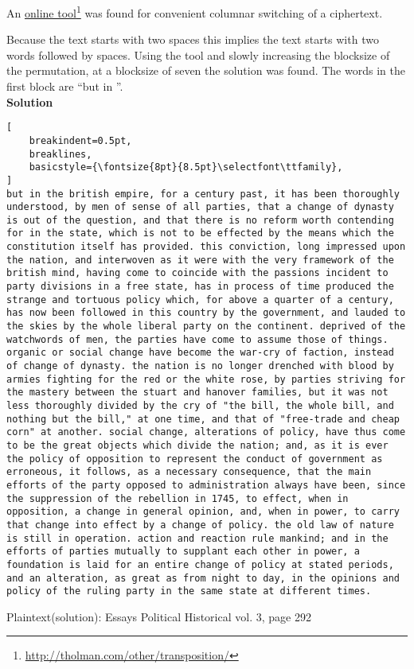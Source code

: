 \documentclass{uva-inf-bachelor-thesis}
\begin{document}
An \href{http://tholman.com/other/transposition/}{online tool}\footnote{\url{http://tholman.com/other/transposition/}}
was found for convenient columnar switching of a ciphertext.

Because the text starts with two spaces this implies the text starts with two
words followed by spaces. Using the tool and slowly increasing the blocksize of
the permutation, at a blocksize of seven the solution was found. The words in
the first block are ``but in ''.\\

\textbf{Solution}
\begin{lstlisting}[
    breakindent=0.5pt,
    breaklines,
    basicstyle={\fontsize{8pt}{8.5pt}\selectfont\ttfamily},
]
but in the british empire, for a century past, it has been thoroughly understood, by men of sense of all parties, that a change of dynasty is out of the question, and that there is no reform worth contending for in the state, which is not to be effected by the means which the constitution itself has provided. this conviction, long impressed upon the nation, and interwoven as it were with the very framework of the british mind, having come to coincide with the passions incident to party divisions in a free state, has in process of time produced the strange and tortuous policy which, for above a quarter of a century, has now been followed in this country by the government, and lauded to the skies by the whole liberal party on the continent. deprived of the watchwords of men, the parties have come to assume those of things. organic or social change have become the war-cry of faction, instead of change of dynasty. the nation is no longer drenched with blood by armies fighting for the red or the white rose, by parties striving for the mastery between the stuart and hanover families, but it was not less thoroughly divided by the cry of "the bill, the whole bill, and nothing but the bill," at one time, and that of "free-trade and cheap corn" at another. social change, alterations of policy, have thus come to be the great objects which divide the nation; and, as it is ever the policy of opposition to represent the conduct of government as erroneous, it follows, as a necessary consequence, that the main efforts of the party opposed to administration always have been, since the suppression of the rebellion in 1745, to effect, when in opposition, a change in general opinion, and, when in power, to carry that change into effect by a change of policy. the old law of nature is still in operation. action and reaction rule mankind; and in the efforts of parties mutually to supplant each other in power, a foundation is laid for an entire change of policy at stated periods, and an alteration, as great as from night to day, in the opinions and policy of the ruling party in the same state at different times.   
\end{lstlisting}
\caption[lstlisting]{Plaintext(solution): Essays Political Historical vol. 3, page 292}
\vspace{20pt}
\end{document}
